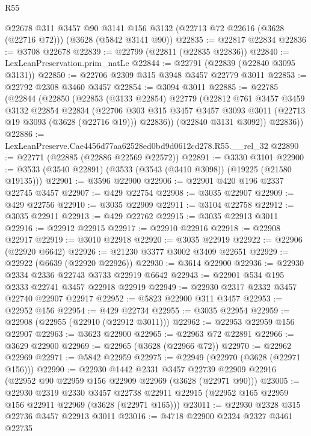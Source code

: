 \begin{lexlean}{R55}
\begin{coremodule}
    @22678
    @311
    @3457
    @90
    @3141
    @156
    @3132
    (@22713 @72 @22616 (@3628 (@22716 @72)))
    (@3628 (@5842 @3141 @90))
@22835 := @22817 @22834
@22836 := @3708 @22678
@22839 := @22799 (@22811 (@22835 @22836))
@22840 := LexLeanPreservation.prim_natLe
@22844 := @22791 (@22839 (@22840 @3095 @3131))
@22850 := @22706 @2309 @315 @3948 @3457 @22779 @3011
@22853 := @22792 @2308 @3460 @3457
@22854 := @3094 @3011
@22885 := @22785
    (@22844
      (@22850
        (@22853
          (@3133 @22854)
          @22779
          (@22812
            @761
            @3457
            @3459
            @3132
            @22854
            @22834
            (@22706
              @303
              @315
              @3457
              @3457
              @3093
              @3011
              (@22713 @19 @3093 (@3628 (@22716 @19)))
              @22836))
          (@22840 @3131 @3092))
        @22836))
@22886 := LexLeanPreserve.Cae4456d77aa62528ed0bd9d0612cd278.R55.__rel_32
@22890 := @22771 (@22885 (@22886 @22569 @22572))
@22891 := @3330 @3101
@22900 := @3533 (@3540 @22891) (@3533 (@3543 (@3410 @3098)) (@19225 (@21580 @19135)))
@22901 := @3596 @22900
@22906 := @22901 @420 @196 @2337 @22745 @3457
@22907 := @429 @22754
@22908 := @3035 @22907
@22909 := @429 @22756
@22910 := @3035 @22909
@22911 := @3104 @22758
@22912 := @3035 @22911
@22913 := @429 @22762
@22915 := @3035 @22913 @3011
@22916 := @22912 @22915
@22917 := @22910 @22916
@22918 := @22908 @22917
@22919 := @3010 @22918
@22920 := @3035 @22919
@22922 := @22906 (@22920 @6642)
@22926 := @21230 @3377 @3002 @3409 @22651
@22929 := @22922 (@6639 (@22920 @22926))
@22930 := @3614 @22900
@22936 := @22930 @2334 @2336 @22743 @3733 @22919 @6642
@22943 := @22901 @534 @195 @2333 @22741 @3457 @22918 @22919
@22949 := @22930 @2317 @2332 @3457 @22740 @22907 @22917
@22952 := @5823 @22900 @311 @3457
@22953 := @22952 @156
@22954 := @429 @22734
@22955 := @3035 @22954
@22959 := @22908 (@22955 (@22910 (@22912 @3011)))
@22962 := @22953 @22959 @156 @22907
@22963 := @3623 @22900
@22965 := @22963 @72 @22891
@22966 := @3629 @22900
@22969 := @22965 (@3628 (@22966 @72))
@22970 := @22962 @22969
@22971 := @5842 @22959
@22975 := @22949 (@22970 (@3628 (@22971 @156)))
@22990 := @22930
    @1442
    @2331
    @3457
    @22739
    @22909
    @22916
    (@22952 @90 @22959 @156 @22909 @22969 (@3628 (@22971 @90)))
@23005 := @22930
    @2319
    @2330
    @3457
    @22738
    @22911
    @22915
    (@22952 @165 @22959 @156 @22911 @22969 (@3628 (@22971 @165)))
@23011 := @22930 @2328 @315 @22736 @3457 @22913 @3011
@23016 := @4718 @22900 @2324 @2327 @3461 @22735

\end{coremodule}
\end{lexlean}
